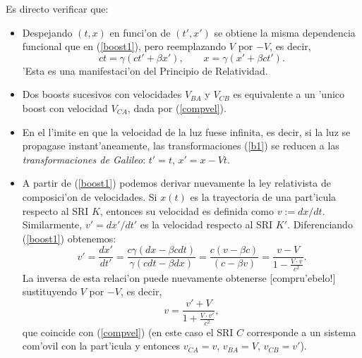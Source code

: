 Es directo verificar que:
\begin{itemize}
\item Despejando $(t,x)$ en funci'on de $(t',x')$ se obtiene la misma
dependencia funcional que en (\ref{boost1}), pero reemplazando $V$ por $-V$, es decir,
\begin{equation}
\boxed{ct=\gamma (ct'+\beta x'), \qquad x=\gamma(x'+\beta ct').} \label{boost2}
\end{equation}
'Esta es una manifestaci'on del Principio de Relatividad.

\item Dos boosts sucesivos con velocidades $V_{BA}$ y $V_{CB}$ es
equivalente a un 'unico boost con velocidad $V_{CA}$, dada por (\ref{compvel}).

\item En el l'imite en que la velocidad de la luz fuese infinita, es decir, si la luz se propagase instant'aneamente, las transformaciones (\ref{b1}) se reducen a las \textit{transformaciones de Galileo}: $t'=t$, $x'=x-Vt$.

\item A partir de (\ref{boost1}) podemos derivar nuevamente la ley relativista de composici'on de velocidades. Si $x(t)$ es la trayectoria de una part'icula respecto al SRI $K$, entonces su velocidad es definida como $v:=dx/dt$. Similarmente, $v'=dx'/dt'$ es la velocidad respecto al SRI $K'$. Diferenciando (\ref{boost1})  obtenemos:
\begin{equation}
 v'=\frac{dx'}{dt'}=\frac{c\gamma(dx-\beta c dt)}{\gamma(cdt-\beta dx)}=\frac{c(v-\beta c)}{(c-\beta v)}=\frac{v-V}{1-\frac{V\cdot v}{c^2}}.
\end{equation}
La inversa de esta relaci'on puede nuevamente obtenerse [compru'ebelo!] sustituyendo $V$ por $-V$, es decir,
\begin{equation}
v=\frac{v'+V}{1+\frac{V\cdot v'}{c^2}},
\end{equation}
que coincide con (\ref{compvel}) (en este caso el SRI $C$ corresponde a un sistema com'ovil con la part'icula y entonces $v_{CA}=v$, $v_{BA}=V$, $v_{CB}=v'$).


\end{itemize}
